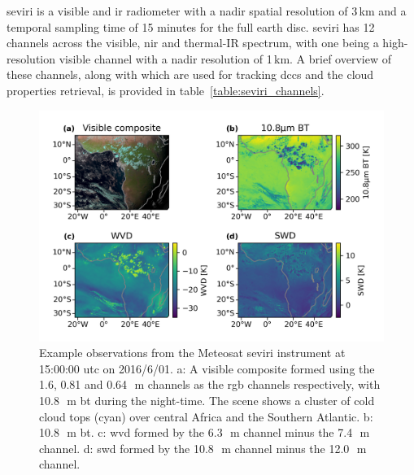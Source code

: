 \acrshort{seviri} is a visible and \acrshort{ir} radiometer with a nadir spatial resolution of 3\,\unit{km} and a temporal sampling time of 15 minutes for the full earth disc. 
\acrshort{seviri} has 12 channels across the visible, \acrshort{nir} and thermal-IR spectrum, with one being a high-resolution visible channel with a nadir resolution of 1\,\unit{km}. 
A brief overview of these channels, along with which are used for tracking \acrshort{dcc}s and the cloud properties retrieval, is provided in table~\ref{table:seviri_channels}.


\begin{figure}[tp]
    \includegraphics[width=\textwidth]{figures/chapter4_01.png}
    \caption[
    Example observations from the Meteosat \acrshort{seviri} instrument at 15:00:00 \acrshort{utc} on 2016/6/01
    ]{
    Example observations from the Meteosat \acrshort{seviri} instrument at 15:00:00 \acrshort{utc} on 2016/6/01. a: A visible composite formed using the 1.6, 0.81 and 0.64\,\unit{\mu m} channels as the \acrshort{rgb} channels respectively, with 10.8\,\unit{\mu m} \acrshort{bt} during the night-time. The scene shows a cluster of cold cloud tops (cyan) over central Africa and the Southern Atlantic. b: 10.8\,\unit{\mu m} \acrshort{bt}. c: \acrshort{wvd} formed by the 6.3\,\unit{\mu m} channel minus the 7.4\,\unit{\mu m} channel. d: \acrshort{swd} formed by the 10.8\,\unit{\mu m} channel minus the 12.0\,\unit{\mu m} channel.
    }
    \label{fig:seviri_obs_example}
\end{figure}

